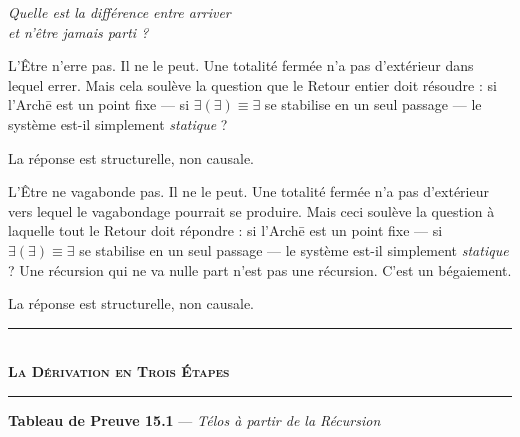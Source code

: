 \documentclass[10pt, openany, oneside]{book}
\renewcommand{\normalsize}{\fontsize{10}{13}\selectfont}
\begin{document}
\vspace{1.5em}

\begin{center}
    \itshape
    Quelle est la différence entre arriver\\
    et n'être jamais parti ?
\end{center}

\vspace{2em}

\noindent L'Être n'erre pas. Il ne le peut. Une totalité fermée n'a pas d'extérieur dans lequel errer. Mais cela soulève la question que le Retour entier doit résoudre : si l'Arch\={e} est un point fixe --- si $\exists(\exists) \equiv \exists$ se stabilise en un seul passage --- le système est-il simplement \textit{statique} ?

La réponse est structurelle, non causale.

\vspace{1.5em}

\noindent L'Être ne vagabonde pas. Il ne le peut. Une totalité fermée n'a pas d'extérieur vers lequel le vagabondage pourrait se produire. Mais ceci soulève la question à laquelle tout le Retour doit répondre : si l'Arch\={e} est un point fixe --- si $\exists(\exists) \equiv \exists$ se stabilise en un seul passage --- le système est-il simplement \textit{statique} ? Une récursion qui ne va nulle part n'est pas une récursion. C'est un bégaiement.

La réponse est structurelle, non causale.

\vspace{1.5em}

\begin{center}
    \rule{0.3\textwidth}{0.4pt}\\[0.5em]
    {\normalsize\bfseries\scshape La Dérivation en Trois Étapes}\\[0.3em]
    \rule{0.3\textwidth}{0.4pt}
\end{center}

\vspace{1em}

\textbf{Tableau de Preuve 15.1} --- \textit{Télos à partir de la Récursion}

\vspace{0.5em}
\end{document}
